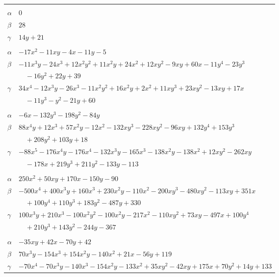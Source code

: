 \documentclass[11pt]{article}
\begin{document}
\begin{longtable}{@{}ll@{}}
\addlinespace[3pt]
\multicolumn{2}{@{}l}{$\{i,j\}=\{68,219\}$, $k_{ij}=3\cdot 7$}\\
$\alpha$ & $0$\\
$\beta$ & $28$\\
$\gamma$ & $14y+21$\\
\addlinespace[3pt]
\multicolumn{2}{@{}l}{$\{i,j\}=\{69,70\}$, $k_{ij}=2\cdot 3$}\\
$\alpha$ & $-17x^{2}-11xy-4x-11y-5$\\
$\beta$ & $-11x^{3}y-24x^{3}+12x^{2}y^{2}+11x^{2}y+24x^{2}+12xy^{2}-9xy+60x-11y^{4}-23y^{3}$\\
 & $\quad -16y^{2}+22y+39$\\
$\gamma$ & $34x^{4}-12x^{3}y-26x^{3}-11x^{2}y^{2}+16x^{2}y+2x^{2}+11xy^{3}+23xy^{2}-13xy+17x$\\
 & $\quad -11y^{3}-y^{2}-21y+60$\\
\addlinespace[3pt]
\multicolumn{2}{@{}l}{$\{i,j\}=\{70,125\}$, $k_{ij}=2\cdot 3^{2}$}\\
$\alpha$ & $-6x-132y^{3}-198y^{2}-84y$\\
$\beta$ & $88x^{4}y+12x^{3}+57x^{2}y-12x^{2}-132xy^{3}-228xy^{2}-96xy+132y^{4}+153y^{3}$\\
 & $\quad +208y^{2}+103y+18$\\
$\gamma$ & $-88x^{5}-176x^{4}y-176x^{4}-132x^{3}y-165x^{3}-138x^{2}y-138x^{2}+12xy^{2}-262xy$\\
 & $\quad -178x+219y^{3}+211y^{2}-133y-113$\\
\addlinespace[3pt]
\multicolumn{2}{@{}l}{$\{i,j\}=\{70,179\}$, $k_{ij}=2^{2}\cdot 3\cdot 5$}\\
$\alpha$ & $250x^{2}+50xy+170x-150y-90$\\
$\beta$ & $-500x^{4}+400x^{3}y+160x^{3}+230x^{2}y-110x^{2}-200xy^{3}-480xy^{2}-113xy+351x$\\
 & $\quad +100y^{4}+110y^{3}+183y^{2}-487y+330$\\
$\gamma$ & $100x^{3}y+210x^{3}-100x^{2}y^{2}-100x^{2}y-217x^{2}-110xy^{2}+73xy-497x+100y^{4}$\\
 & $\quad +210y^{3}+143y^{2}-244y-367$\\
\addlinespace[3pt]
\multicolumn{2}{@{}l}{$\{i,j\}=\{70,180\}$, $k_{ij}=2^{4}\cdot 7$}\\
$\alpha$ & $-35xy+42x-70y+42$\\
$\beta$ & $70x^{3}y-154x^{3}+154x^{2}y-140x^{2}+21x-56y+119$\\
$\gamma$ & $-70x^{4}-70x^{3}y-140x^{3}-154x^{2}y-133x^{2}+35xy^{2}-42xy+175x+70y^{2}+14y+133$\\

\end{longtable}
\end{document}

